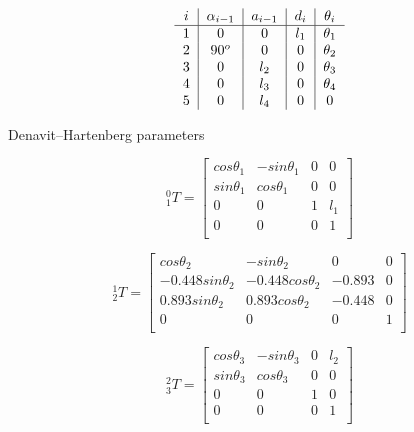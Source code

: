 \documentclass[transmag]{IEEEtran}
\begin{document}
\begin{eqfloat}
\begin{equation}
\begin{tabular}{c|c|c|c|c}
$i$  & $\alpha_{i-1}$ & $a_{i-1}$ & $d_i$        & $\theta_i$ \\
\hline
1    &  0             &  0         &  $l_1$ & $\theta_1$ \\
2    &  $90^o$        &  0         &  0     & $\theta_2$ \\
3    &  0             &  $l_2$     &  0     & $\theta_3$ \\
4    &  0             &  $l_3$     &  0     & $\theta_4$ \\
5    &  0             &  $l_4$     &  0     & 0 \\
\end{tabular}
\end{equation}

\begin{center}
Denavit–Hartenberg parameters
\end{center}




\begin{equation}
^0_1T =
\begin{bmatrix}
cos\theta_1 & -sin\theta_1 & 0 & 0   \\
sin\theta_1 & cos\theta_1  & 0 & 0   \\
0           & 0            & 1 & l_1 \\
0           & 0            & 0 & 1   \\
\end{bmatrix}
\end{equation}


\begin{equation}
^1_2T =
\begin{bmatrix}
cos\theta_2 & -sin\theta_2 & 0      & 0   \\
-0.448 sin\theta_2     & -0.448 cos\theta_2      & -0.893 & 0   \\
0.893 sin\theta_2      & 0.893 cos\theta_2       & -0.448 & 0   \\
0           & 0            & 0      & 1   \\
\end{bmatrix}
\end{equation}




\begin{equation}
^2_3T =
\begin{bmatrix}
cos\theta_3 & -sin\theta_3 & 0      & l_2  \\
sin\theta_3 & cos\theta_3  & 0      & 0   \\
0           & 0            & 1      & 0   \\
0           & 0            & 0      & 1   \\
\end{bmatrix}
\end{equation}




\end{eqfloat}
\end{document}
